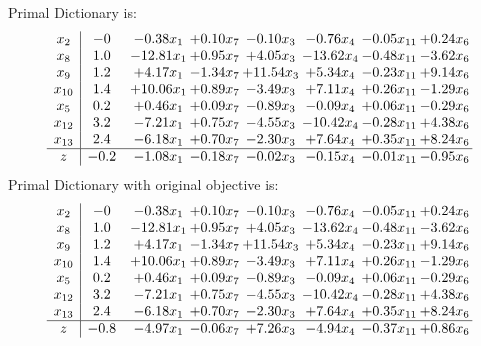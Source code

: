\documentclass[9pt]{article}
\begin{document}
Primal Dictionary is:
\[\begin{array}{c| c c@{\hskip 2pt} c@{\hskip 2pt} c@{\hskip 2pt} c@{\hskip 2pt} c@{\hskip 2pt} c@{\hskip 2pt} }
 x_{2}   &  -0 & -0.38 x_{1} & +  0.10 x_{7} & -0.10 x_{3} & -0.76 x_{4} & -0.05 x_{11} & +  0.24 x_{6}\\
 x_{8}   &  1.0 & -12.81 x_{1} & +  0.95 x_{7} & +  4.05 x_{3} & -13.62 x_{4} & -0.48 x_{11} & -3.62 x_{6}\\
 x_{9}   &  1.2 & +  4.17 x_{1} & -1.34 x_{7} & + 11.54 x_{3} & +  5.34 x_{4} & -0.23 x_{11} & +  9.14 x_{6}\\
 x_{10}   &  1.4 & + 10.06 x_{1} & +  0.89 x_{7} & -3.49 x_{3} & +  7.11 x_{4} & +  0.26 x_{11} & -1.29 x_{6}\\
 x_{5}   &  0.2 & +  0.46 x_{1} & +  0.09 x_{7} & -0.89 x_{3} & -0.09 x_{4} & +  0.06 x_{11} & -0.29 x_{6}\\
 x_{12}   &  3.2 & -7.21 x_{1} & +  0.75 x_{7} & -4.55 x_{3} & -10.42 x_{4} & -0.28 x_{11} & +  4.38 x_{6}\\
 x_{13}   &  2.4 & -6.18 x_{1} & +  0.70 x_{7} & -2.30 x_{3} & +  7.64 x_{4} & +  0.35 x_{11} & +  8.24 x_{6}\\
\hline
z    &  -0.2 & -1.08 x_{1} & -0.18 x_{7} & -0.02 x_{3} & -0.15 x_{4} & -0.01 x_{11} & -0.95 x_{6}\\
\end{array}\]
Primal Dictionary with original objective is:
\[\begin{array}{c| c c@{\hskip 2pt} c@{\hskip 2pt} c@{\hskip 2pt} c@{\hskip 2pt} c@{\hskip 2pt} c@{\hskip 2pt} }
 x_{2}   &  -0 & -0.38 x_{1} & +  0.10 x_{7} & -0.10 x_{3} & -0.76 x_{4} & -0.05 x_{11} & +  0.24 x_{6}\\
 x_{8}   &  1.0 & -12.81 x_{1} & +  0.95 x_{7} & +  4.05 x_{3} & -13.62 x_{4} & -0.48 x_{11} & -3.62 x_{6}\\
 x_{9}   &  1.2 & +  4.17 x_{1} & -1.34 x_{7} & + 11.54 x_{3} & +  5.34 x_{4} & -0.23 x_{11} & +  9.14 x_{6}\\
 x_{10}   &  1.4 & + 10.06 x_{1} & +  0.89 x_{7} & -3.49 x_{3} & +  7.11 x_{4} & +  0.26 x_{11} & -1.29 x_{6}\\
 x_{5}   &  0.2 & +  0.46 x_{1} & +  0.09 x_{7} & -0.89 x_{3} & -0.09 x_{4} & +  0.06 x_{11} & -0.29 x_{6}\\
 x_{12}   &  3.2 & -7.21 x_{1} & +  0.75 x_{7} & -4.55 x_{3} & -10.42 x_{4} & -0.28 x_{11} & +  4.38 x_{6}\\
 x_{13}   &  2.4 & -6.18 x_{1} & +  0.70 x_{7} & -2.30 x_{3} & +  7.64 x_{4} & +  0.35 x_{11} & +  8.24 x_{6}\\
\hline
z    &  -0.8 & -4.97 x_{1} & -0.06 x_{7} & +  7.26 x_{3} & -4.94 x_{4} & -0.37 x_{11} & +  0.86 x_{6}\\
\end{array}\]
\end{document}
